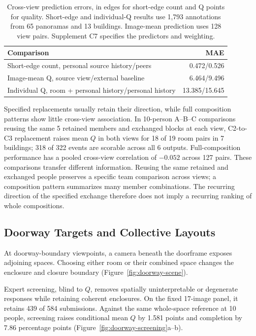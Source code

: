 \begin{table}[t]
\centering\small
\caption{Cross-view prediction errors, in edges for short-edge count and Q points for quality. Short-edge and individual-Q results use 1,793 annotations from 65 panoramas and 13 buildings. Image-mean prediction uses 128 view pairs. Supplement C7 specifies the predictors and weighting.}
\label{tab:same-room-evidence}
\setlength{\tabcolsep}{3pt}
\begin{tabular}{@{}p{.65\linewidth}r@{}}
\toprule
Comparison & MAE\\
\midrule
Short-edge count, personal source history/peers & 0.472/0.526\\
Image-mean Q, source view/external baseline & 6.464/9.496\\
Individual Q, room + personal history/personal history & 13.385/15.645\\
\bottomrule
\end{tabular}
\end{table}

Specified replacements usually retain their direction, while full composition patterns show little cross-view association. In 10-person A--B--C comparisons reusing the same 5 retained members and exchanged blocks at each view, C2-to-C3 replacement raises mean $Q$ in both views for 18 of 19 room pairs in 7 buildings; 318 of 322 events are scorable across all 6 outputs. Full-composition performance has a pooled cross-view correlation of $-0.052$ across 127 pairs. These comparisons transfer different information. Reusing the same retained and exchanged people preserves a specific team comparison across views; a composition pattern summarizes many member combinations. The recurring direction of the specified exchange therefore does not imply a recurring ranking of whole compositions.

\subsection{Doorway Targets and Collective Layouts}
\label{sec:doorway}

At doorway-boundary viewpoints, a camera beneath the doorframe exposes adjoining spaces. Choosing either room or their combined space changes the enclosure and closure boundary (Figure~\ref{fig:doorway-scene}).



Expert screening, blind to $Q$, removes spatially uninterpretable or degenerate responses while retaining coherent enclosures. On the fixed 17-image panel, it retains 439 of 584 submissions. Against the same whole-space reference at 10 people, screening raises conditional mean $Q$ by 1.581 points and completion by 7.86 percentage points (Figure~\ref{fig:doorway-screening}a--b).

